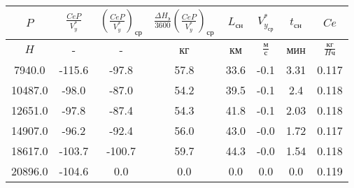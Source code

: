 \begin{tabular}{|c|c|c|c|c|c|c|c|}
\hline
$P$ & $\frac{CeP}{V_y^*}$ & $(\frac{CeP}{V_y^*})_{ср}$ & $\frac{\Delta H_э}{3600}(\frac{CeP}{V_y^*})_{ср}$ & $L_{сн}$ & $V_{y_{ср}}^*$ & $t_{сн}$ & $Ce$ \\ 
\hline
$H$ & - & - & кг & км & $\frac{м}{с}$ & мин & $\frac{кг}{H ч}$ \\ 
\hline
7940.0 & -115.6 & -97.8 & 57.8 & 33.6 & -0.1 & 3.31 & 0.117 \\ 
\hline
10487.0 & -98.0 & -87.0 & 54.2 & 39.5 & -0.1 & 2.4 & 0.118 \\ 
\hline
12651.0 & -97.8 & -87.4 & 54.3 & 41.8 & -0.1 & 2.03 & 0.118 \\ 
\hline
14907.0 & -96.2 & -92.4 & 56.0 & 43.0 & -0.0 & 1.72 & 0.117 \\ 
\hline
18617.0 & -103.7 & -100.7 & 59.7 & 44.3 & -0.0 & 1.54 & 0.118 \\ 
\hline
20896.0 & -104.6 & 0.0 & 0.0 & 0.0 & 0.0 & 0.0 & 0.119 \\ 
\hline
\end{tabular}